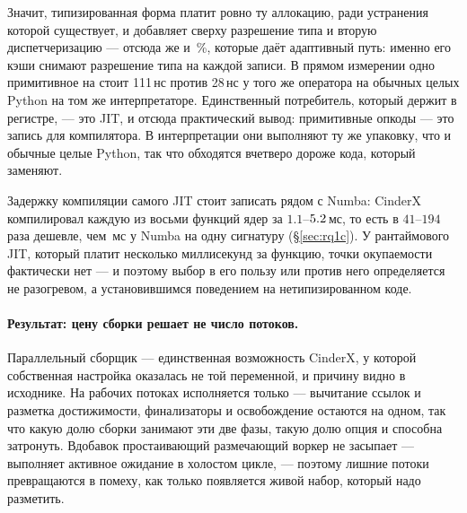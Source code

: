 Значит, типизированная форма платит ровно ту аллокацию, ради устранения которой существует, и
добавляет сверху разрешение типа и вторую диспетчеризацию --- отсюда же и \,\%, которые даёт
адаптивный путь: именно его кэши снимают разрешение типа на каждой записи. В прямом измерении одно
примитивное  на  стоит 111\,нс против 28\,нс у того же оператора на
обычных целых Python на том же интерпретаторе. Единственный потребитель, который держит
 в регистре, --- это JIT, и отсюда практический вывод: примитивные опкоды --- это
запись для компилятора. В интерпретации они выполняют ту же упаковку, что и обычные целые
Python, так что обходятся вчетверо дороже кода, который заменяют.

Задержку компиляции самого JIT стоит записать рядом с Numba: CinderX компилировал каждую из
восьми функций ядер за $1.1$--$\meas{med:b6_cinderx-fork_jit:jit_force_compile/fork_jit/mandelbrot_py:ms}{5.2}$\,мс, то есть в $41$--$194$ раза дешевле, чем \,мс у Numba на
одну сигнатуру (\S\ref{sec:rq1c}). У рантаймового JIT, который платит несколько миллисекунд за
функцию, точки окупаемости фактически нет --- и поэтому выбор в его пользу или против него определяется не
разогревом, а установившимся поведением на нетипизированном коде.

\paragraph{Результат: цену сборки решает не число потоков.}
Параллельный сборщик --- единственная возможность CinderX, у которой собственная настройка
оказалась не той переменной, и причину видно в исходнике. На рабочих потоках исполняется только
 --- вычитание ссылок и разметка достижимости, финализаторы и
освобождение остаются на одном, так что какую долю сборки занимают эти две фазы, такую долю опция
и способна затронуть. Вдобавок простаивающий размечающий воркер не засыпает ---
 выполняет активное ожидание в холостом цикле, --- поэтому лишние потоки превращаются в помеху,
как только появляется живой набор, который надо разметить.

